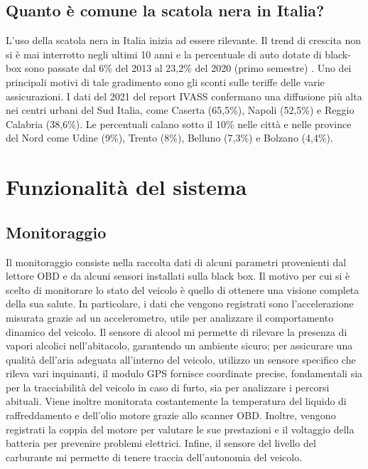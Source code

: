 \documentclass[12pt, a4paper, italian]{report}
\numberwithin{figure}{chapter}
\numberwithin{table}{chapter}
\begin{document}
\section{Quanto è comune la scatola nera in Italia?}
L'uso della scatola nera in Italia inizia ad essere rilevante. Il trend di crescita non si è mai interrotto negli ultimi 10 anni e la percentuale di auto dotate di black-box sono passate dal 6\% del 2013 al 23,2\% del 2020 (primo semestre)  \cite{Telepass}. Uno dei principali motivi di tale gradimento sono gli sconti sulle teriffe delle varie assicurazioni. I dati del 2021 del report IVASS confermano una diffusione più alta nei centri urbani del Sud Italia, come Caserta (65,5\%), Napoli (52,5\%) e Reggio Calabria (38,6\%). Le percentuali calano sotto il 10\% nelle città e nelle province del Nord come Udine (9\%), Trento (8\%), Belluno (7,3\%) e Bolzano (4,4\%).

\chapter{Funzionalità del sistema}
\section{Monitoraggio}
Il monitoraggio consiste nella raccolta dati di alcuni parametri provenienti dal lettore OBD e da alcuni sensori installati sulla black box. 
Il motivo per cui si è scelto di monitorare lo stato del veicolo è quello di ottenere una visione completa della sua salute. In particolare, i dati che vengono registrati sono l'accelerazione misurata grazie ad un accelerometro, utile per analizzare il comportamento dinamico del veicolo. Il sensore di alcool mi permette di rilevare la presenza di vapori alcolici nell'abitacolo, garantendo un ambiente sicuro; per assicurare una qualità dell'aria adeguata all'interno del veicolo, utilizzo un sensore specifico che rileva vari inquinanti, il modulo GPS fornisce coordinate precise, fondamentali sia per la tracciabilità del veicolo in caso di furto, sia per analizzare i percorsi abituali. Viene inoltre monitorata  costantemente la temperatura del liquido di raffreddamento e dell'olio motore grazie allo scanner OBD. Inoltre, vengono registrati la coppia del motore per valutare le sue prestazioni e il voltaggio della batteria per prevenire problemi elettrici.
Infine, il sensore del livello del carburante mi permette di tenere traccia dell'autonomia del veicolo. 
\end{document}
